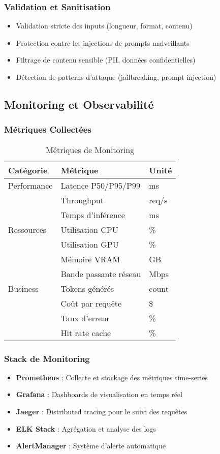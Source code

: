 \documentclass[12pt,a4paper]{article}
\begin{document}
\subsubsection{Validation et Sanitisation}
\begin{itemize}[noitemsep]
    \item Validation stricte des inputs (longueur, format, contenu)
    \item Protection contre les injections de prompts malveillants
    \item Filtrage de contenu sensible (PII, données confidentielles)
    \item Détection de patterns d'attaque (jailbreaking, prompt injection)
\end{itemize}

\subsection{Monitoring et Observabilité}

\subsubsection{Métriques Collectées}
\begin{table}[h]
\centering
\begin{tabular}{|l|l|l|}
\hline
\textbf{Catégorie} & \textbf{Métrique} & \textbf{Unité} \\
\hline
Performance & Latence P50/P95/P99 & ms \\
 & Throughput & req/s \\
 & Temps d'inférence & ms \\
\hline
Ressources & Utilisation CPU & \% \\
 & Utilisation GPU & \% \\
 & Mémoire VRAM & GB \\
 & Bande passante réseau & Mbps \\
\hline
Business & Tokens générés & count \\
 & Coût par requête & \$ \\
 & Taux d'erreur & \% \\
 & Hit rate cache & \% \\
\hline
\end{tabular}
\caption{Métriques de Monitoring}
\end{table}

\subsubsection{Stack de Monitoring}
\begin{itemize}[leftmargin=2cm]
    \item \textbf{Prometheus} : Collecte et stockage des métriques time-series
    \item \textbf{Grafana} : Dashboards de visualisation en temps réel
    \item \textbf{Jaeger} : Distributed tracing pour le suivi des requêtes
    \item \textbf{ELK Stack} : Agrégation et analyse des logs
    \item \textbf{AlertManager} : Système d'alerte automatique
\end{itemize}
\end{document}
